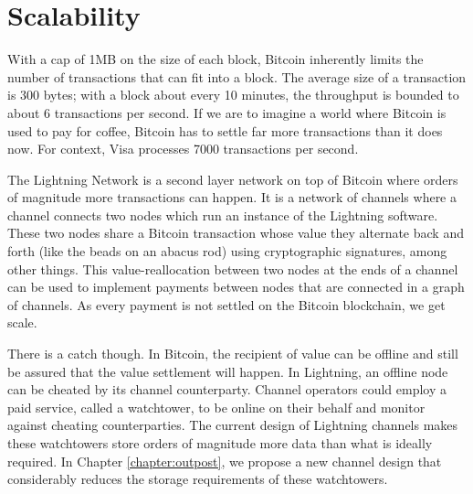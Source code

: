 \section{Scalability}
With a cap of 1MB on the size of each block, Bitcoin inherently limits the number of transactions that can fit into a block. The average size of a transaction is 300 bytes; with a block about every 10 minutes, the throughput is bounded to about 6 transactions per second. If we are to imagine a world where Bitcoin is used to pay for coffee, Bitcoin has to settle far more transactions than it does now. For context, Visa processes 7000 transactions per second. 

The Lightning Network is a second layer network on top of Bitcoin where orders of magnitude more transactions can happen. It is a network of channels where a channel connects two nodes which run an instance of the Lightning software. These two nodes share a Bitcoin transaction whose value they alternate back and forth (like the beads on an abacus rod) using cryptographic signatures, among other things. This value-reallocation between two nodes at the ends of a channel can be used to implement payments between nodes that are connected in a graph of channels. As every payment is not settled on the Bitcoin blockchain, we get scale. 

There is a catch though. In Bitcoin, the recipient of value can be offline and still be assured that the value settlement will happen. In Lightning, an offline node can be cheated by its channel counterparty. Channel operators could employ a paid service, called a watchtower, to be online on their behalf and monitor against cheating counterparties. The current design of Lightning channels makes these watchtowers store orders of magnitude more data than what is ideally required. In Chapter \ref{chapter:outpost}, we propose a new channel design that considerably reduces the storage requirements of these watchtowers. 

